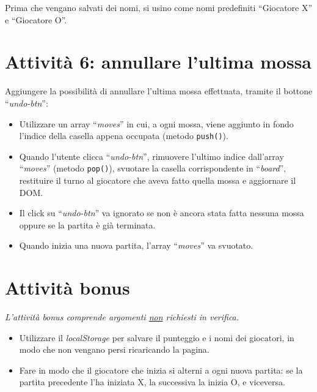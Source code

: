 \documentclass[a4paper,11pt]{article}
\newcommand{\elem}[1]{``\textit{#1}''}
\begin{document}
Prima che vengano salvati dei nomi, si usino come nomi predefiniti
``Giocatore X'' e ``Giocatore O''.

\section*{Attività 6: annullare l'ultima mossa}

Aggiungere la possibilità di annullare l'ultima mossa effettuata, tramite il
bottone \elem{undo-btn}:

\begin{itemize}
    \item Utilizzare un array \elem{moves} in cui, a ogni mossa, viene
    aggiunto in fondo l'indice della casella appena occupata (metodo
    \texttt{push()}).
    \item Quando l'utente clicca \elem{undo-btn}, rimuovere l'ultimo indice
    dall'array \elem{moves} (metodo \texttt{pop()}), svuotare la casella
    corrispondente in \elem{board}, restituire il turno al giocatore che aveva
    fatto quella mossa e aggiornare il DOM.
    \item Il click su \elem{undo-btn} va ignorato se non è ancora stata fatta
    nessuna mossa oppure se la partita è già terminata.
    \item Quando inizia una nuova partita, l'array \elem{moves} va svuotato.
\end{itemize}

\section*{Attività bonus}

\textit{L'attività bonus comprende argomenti \underline{non} richiesti in verifica.}

\begin{itemize}
    \item Utilizzare il \textit{localStorage} per salvare il punteggio e i nomi
    dei giocatori, in modo che non vengano persi ricaricando la pagina.
    \item Fare in modo che il giocatore che inizia si alterni a ogni nuova
    partita: se la partita precedente l'ha iniziata X, la successiva la inizia
    O, e viceversa.
\end{itemize}
\end{document}

